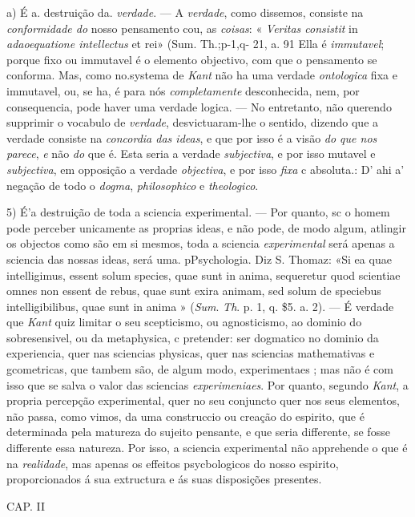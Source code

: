 a) É a. destruição da. \emph{verdade}. --- A \emph{verdade}, como dissemos, consiste na \emph{conformidade do} nosso pensamento cou, as \emph{coisas}: « \emph{Veritas consistit} in \emph{adaoequatione intellectus} et rei» (Sum. Th.;p-1,q- 21, a. 91 Ella é \emph{immutavel}; porque fixo ou immutavel é o elemento objectivo, com que o pensamento se conforma. Mas, como no.systema de \emph{Kant} não ha uma verdade \emph{ontologica} fixa e immutavel, ou, se ha, é para nós \emph{completamente} desconhecida, nem, por consequencia, pode haver uma verdade logica. --- No entretanto, não querendo supprimir o vocabulo de \emph{verdade}, desvictuaram-lhe o sentido, dizendo que a verdade consiste na \emph{concordia das ideas}, e que por isso é a visão \emph{do que nos parece}, \emph{e} não \emph{do} que é. Esta seria a verdade \emph{subjectiva}, e por isso mutavel e \emph{subjectiva}, em opposição a verdade \emph{objectiva}, e por isso \emph{fixa} c absoluta.: D' ahi a' negação de todo o \emph{dogma}, \emph{philosophico} e \emph{theologico}.

5) É'a destruição de toda a sciencia experimental. --- Por quanto, sc o homem pode perceber unicamente as proprias ideas, e não pode, de modo algum, atlingir os objectos como são em si mesmos, toda a sciencia \emph{experimental} será apenas a sciencia das nossas ideas, será uma. pPsychologia. Diz S. Thomaz: «Si ea quae intelligimus, essent solum species, quae sunt in anima, sequeretur quod scientiae omnes non essent de rebus, quae sunt exira animam, sed solum de speciebus intelligibilibus, quae sunt in anima » (\emph{Sum}. \emph{Th}. p. 1, q. \$5. a. 2). --- É verdade que \emph{Kant} quiz limitar o seu scepticismo, ou agnosticismo, ao dominio do sobresensivel, ou da metaphysica, c pretender: ser dogmatico no dominio da experiencia, quer nas sciencias physicas, quer nas sciencias mathemativas e gcometricas, que tambem são, de algum modo, experimentaes ; mas não é com isso que se salva o valor das sciencias \emph{experimeniaes}. Por quanto, segundo \emph{Kant}, a propria percepção experimental, quer no seu conjuncto quer nos seus elementos, não passa, como vimos, da uma construccio ou creação do espirito, que é determinada pela matureza do sujeito pensante, e que seria differente, se fosse differente essa natureza. Por isso, a sciencia experimental não apprehende o que é na \emph{realidade}, mas apenas os effeitos psycbologicos do nosso espirito, proporcionados á sua extructura e ás suas disposições presentes.

CAP. II

